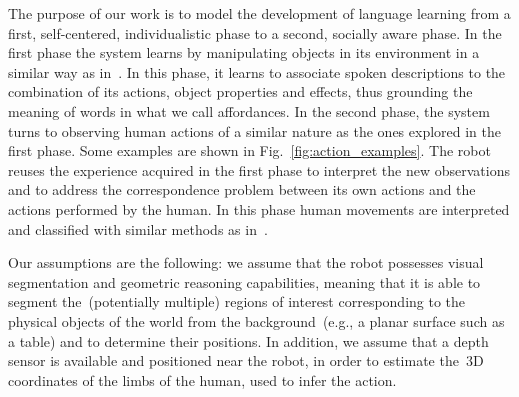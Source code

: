 The purpose of
our work
is to model the development of language learning from a first, self-centered, individualistic phase to a second, socially aware phase.
In the first phase the system learns by manipulating objects in its environment in a similar way as in~\cite{salvi:2012:smcb}.
In this phase, it learns to associate spoken descriptions to the combination of its actions, object properties and effects, thus grounding the meaning of words in what we call affordances.
In the second phase, the system turns to observing human actions of a similar nature as the ones explored in the first phase. Some examples are shown in Fig.~\ref{fig:action_examples}.
The robot reuses the experience acquired in the first phase to interpret the new observations and to address the correspondence problem between its own actions and the actions performed by the human.
In this phase human movements are interpreted and classified with similar methods as in~\cite{saponaro:2013:crhri}.

Our assumptions are the following:
we assume that the robot possesses visual segmentation and geometric reasoning capabilities, meaning that it is able to segment the~(potentially multiple) regions of interest corresponding to the physical objects of the world from the background~(e.g., a planar surface such as a table) and to determine their positions.
In addition, we assume that a depth sensor is available and positioned near the robot, in order to estimate the~3D coordinates of the limbs of the human, used to infer the action.

